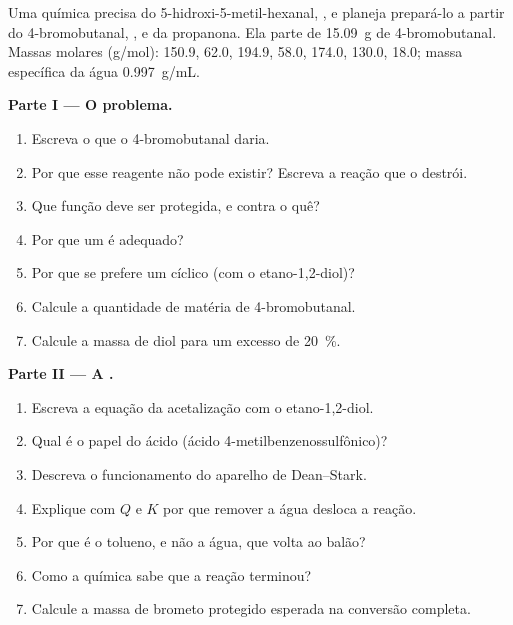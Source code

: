 \begin{problem}
\label{pb:b1:acetals-protection:1}
Uma química precisa do 5-hidroxi-5-metil-hexanal, , e
planeja prepará-lo a partir do 4-bromobutanal, , e da propanona.
Ela parte de \qty{15.09}{g} de 4-bromobutanal. Massas molares
(\unit{g/mol}):  150.9,  62.0,  194.9,
 58.0,  174.0,  130.0,  18.0;
massa específica da água \qty{0.997}{g/mL}.

\medskip
\noindent\textbf{Parte I --- O problema.}
\begin{enumerate}
  \item Escreva o  que o 4-bromobutanal daria.
  \item Por que esse reagente não pode existir? Escreva a reação que o
        destrói.
  \item Que função deve ser protegida, e contra o quê?
  \item Por que um  é adequado?
  \item Por que se prefere um  cíclico (com o etano-1,2-diol)?
  \item Calcule a quantidade de matéria de 4-bromobutanal.
  \item Calcule a massa de diol para um excesso de \qty{20}{\percent}.
\end{enumerate}

\medskip
\noindent\textbf{Parte II --- A .}
\begin{enumerate}[resume]
  \item Escreva a equação da acetalização com o etano-1,2-diol.
  \item Qual é o papel do  ácido (ácido
        4-metilbenzenossulfônico)?
  \item Descreva o funcionamento do aparelho de Dean--Stark.
  \item Explique com $Q$ e $K$ por que remover a água desloca a reação.
  \item Por que é o tolueno, e não a água, que volta ao balão?
  \item Como a química sabe que a reação terminou?
  \item Calcule a massa de brometo protegido esperada na conversão completa.
\end{enumerate}


\end{problem}
